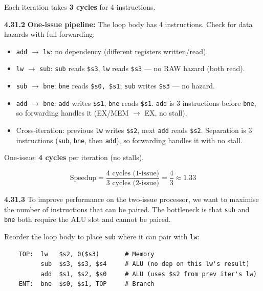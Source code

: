\noindent Each iteration takes \textbf{3 cycles} for 4 instructions.

\medskip\noindent\textbf{4.31.2}
\textbf{One-issue pipeline:} The loop body has 4 instructions.  Check for
data hazards with full forwarding:

\begin{itemize}
\item \texttt{add} $\to$ \texttt{lw}: no dependency (different registers written/read).
\item \texttt{lw} $\to$ \texttt{sub}: \texttt{sub} reads \texttt{\$s3},
      \texttt{lw} reads \texttt{\$s3} --- no RAW hazard (both read).
\item \texttt{sub} $\to$ \texttt{bne}: \texttt{bne} reads \texttt{\$s0, \$s1};
      \texttt{sub} writes \texttt{\$s3} --- no hazard.
\item \texttt{add} $\to$ \texttt{bne}: \texttt{add} writes \texttt{\$s1},
      \texttt{bne} reads \texttt{\$s1}.  \texttt{add} is 3 instructions before
      \texttt{bne}, so forwarding handles it (EX/MEM $\to$ EX, no stall).
\item Cross-iteration: previous \texttt{lw} writes \texttt{\$s2},
      next \texttt{add} reads \texttt{\$s2}.  Separation is 3 instructions
      (\texttt{sub}, \texttt{bne}, then \texttt{add}), so forwarding handles
      it with no stall.
\end{itemize}

One-issue: \textbf{4 cycles} per iteration (no stalls).

\[
\text{Speedup} = \frac{4 \text{ cycles (1-issue)}}{3 \text{ cycles (2-issue)}}
              = \frac{4}{3} \approx 1.33
\]

\medskip\noindent\textbf{4.31.3}
To improve performance on the two-issue processor, we want to maximise the
number of instructions that can be paired.  The bottleneck is that
\texttt{sub} and \texttt{bne} both require the ALU slot and cannot be paired.

Reorder the loop body to place \texttt{sub} where it can pair with
\texttt{lw}:

\begin{verbatim}
    TOP:  lw   $s2, 0($s3)       # Memory
          sub  $s3, $s3, $s4     # ALU (no dep on this lw's result)
          add  $s1, $s2, $s0     # ALU (uses $s2 from prev iter's lw)
    ENT:  bne  $s0, $s1, TOP     # Branch
\end{verbatim}

